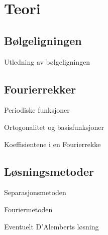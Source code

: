 \section{Teori}
\subsection{Bølgeligningen}
Utledning av bølgeligningen

\subsection{Fourierrekker}
Periodiske funksjoner

Ortogonalitet og basisfunksjoner

Koeffisientene i en Fourierrekke

\subsection{Løsningsmetoder}
Separasjonsmetoden

Fouriermetoden

Eventuelt D’Alemberts løsning
